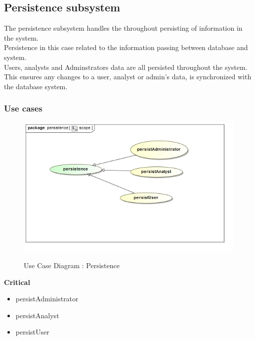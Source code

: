 \documentclass{article}
\begin{document}


	\pagebreak
	\subsection{Persistence subsystem}\label{subsec:Persistence}
	The persistence subsystem handles the throughout persisting of information in the system. \\Persistence in this case related to the information passing between database and system. \\ Users, analysts and Adminstrators data are all persisted throughout the system. \\ This ensures any changes to a user, analyst or admin's data, is synchronized with the database system.
		\subsubsection{Use cases}

		\begin{figure}[H]
		\includegraphics[width=\textwidth]{images/uc__persistence__scope.jpg}  \\
		\caption{Use Case Diagram : Persistence}
		\end{figure}

		\begin{flushleft}
			\textbf{Critical}
				\begin{itemize}
					\item persistAdministrator
					\item persistAnalyst
					\item persistUser
				\end{itemize}
		\end{flushleft}
\end{document}
